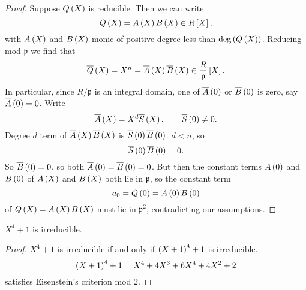 \begin{proof}
Suppose $ Q\left( X \right) $ is reducible. Then we can write
$$ Q\left( X \right) = A\left( X \right)B\left( X \right) \in R\left[ X \right], $$
with $ A\left( X \right) $ and $ B\left( X \right) $ monic of positive degree less than $ \deg\left( Q\left( X \right) \right) $. Reducing mod $ \mathfrak{p} $ we find that
$$ \overline{Q}\left( X \right) = X^n = \overline{A}\left( X \right)\overline{B}\left( X \right) \in \dfrac{R}{\mathfrak{p}}\left[ X \right]. $$
In particular, since $ R / \mathfrak{p} $ is an integral domain, one of $ \overline{A}\left( 0 \right) $ or $ \overline{B}\left( 0 \right) $ is zero, say $ \overline{A}\left( 0 \right) = 0 $. Write
$$ \overline{A}\left( X \right) = X^d\overline{S}\left( X \right), \qquad \overline{S}\left( 0 \right) \ne 0. $$
Degree $ d $ term of $ \overline{A}\left( X \right)\overline{B}\left( X \right) $ is $ \overline{S}\left( 0 \right)\overline{B}\left( 0 \right) $. $ d < n $, so
$$ \overline{S}\left( 0 \right)\overline{B}\left( 0 \right) = 0. $$
So $ \overline{B}\left( 0 \right) = 0 $, so both $ \overline{A}\left( 0 \right) = \overline{B}\left( 0 \right) = 0 $. But then the constant terms $ A\left( 0 \right) $ and $ B\left( 0 \right) $ of $ A\left( X \right) $ and $ B\left( X \right) $ both lie in $ \mathfrak{p} $, so the constant term
$$ a_0 = Q\left( 0 \right) = A\left( 0 \right)B\left( 0 \right) $$
of $ Q\left( X \right) = A\left( X \right)B\left( X \right) $ must lie in $ \mathfrak{p}^2 $, contradicting our assumptions.
\end{proof}

\begin{corollary}
$ X^4 + 1 $ is irreducible.
\end{corollary}

\begin{proof}
$ X^4 + 1 $ is irreducible if and only if $ \left( X + 1 \right)^4 + 1 $ is irreducible.
$$ \left( X + 1 \right)^4 + 1 = X^4 + 4X^3 + 6X^4 + 4X^2 + 2 $$
satisfies Eisenstein's criterion mod $ 2 $.
\end{proof}



